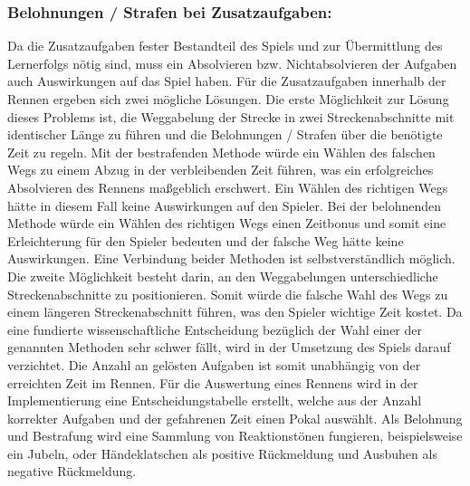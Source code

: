 	\subsubsection*{Belohnungen / Strafen bei Zusatzaufgaben:}
		Da die Zusatzaufgaben fester Bestandteil des Spiels und zur Übermittlung des Lernerfolgs nötig sind, muss ein Absolvieren bzw. Nichtabsolvieren der Aufgaben auch Auswirkungen auf das Spiel haben. Für die Zusatzaufgaben innerhalb der Rennen ergeben sich zwei mögliche Lösungen.
		Die erste Möglichkeit zur Lösung dieses Problems ist, die Weggabelung der Strecke in zwei Streckenabschnitte mit identischer Länge zu führen und die Belohnungen / Strafen über die benötigte Zeit zu regeln. Mit der bestrafenden Methode würde ein Wählen des falschen Wegs zu einem Abzug in der verbleibenden Zeit führen, was ein erfolgreiches Absolvieren des Rennens maßgeblich erschwert. Ein Wählen des richtigen Wegs hätte in diesem Fall keine Auswirkungen auf den Spieler.
		Bei der belohnenden Methode würde ein Wählen des richtigen Wegs einen Zeitbonus und somit eine Erleichterung für den Spieler bedeuten und der falsche Weg hätte keine Auswirkungen. Eine Verbindung beider Methoden ist selbstverständlich möglich.
		Die zweite Möglichkeit besteht darin, an den Weggabelungen unterschiedliche Streckenabschnitte zu positionieren. Somit würde die falsche Wahl des Wegs zu einem längeren Streckenabschnitt führen, was den Spieler wichtige Zeit kostet.
		Da eine fundierte wissenschaftliche Entscheidung bezüglich der Wahl einer der genannten Methoden sehr schwer fällt, wird in der Umsetzung des Spiels darauf verzichtet.
		Die Anzahl an gelösten Aufgaben ist somit unabhängig von der erreichten Zeit im Rennen. Für die Auswertung eines Rennens wird in der Implementierung eine Entscheidungstabelle erstellt, welche aus der Anzahl korrekter Aufgaben und der gefahrenen Zeit einen Pokal auswählt.
		Als Belohnung und Bestrafung wird eine Sammlung von Reaktionstönen fungieren, beispielsweise ein Jubeln, oder Händeklatschen als positive Rückmeldung und Ausbuhen als negative Rückmeldung.

